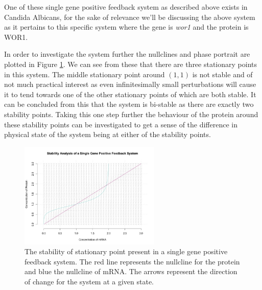 \documentclass[]{article}
\begin{document}
            One of these single gene positive feedback system as described above exists in Candida Albicans, for the sake of relevance we'll be discussing the above system as it pertains to this specific system where the gene is \textit{wor1} and the protein is WOR1. 
            
            In order to investigate the system further the nullclines and phase portrait are plotted in Figure \ref{stabilitySinglePositive}. We can see from these that there are three stationary points in this system. The middle stationary point around $(1,1)$ is not stable and of not much practical interest as even infinitesimally small perturbations will cause it to tend towards one of the other stationary points of which are both stable. It can be concluded from this that the system is bi-stable as there are exactly two stability points. Taking this one step further the behaviour of the protein around these stability points can be investigated to get a sense of the difference in physical state of the system being at either of the stability points. 
            
             \begin{figure}[h!]
            \centering
            \includegraphics[width=0.6\textwidth]{./figures/stabilitySinglePositive.jpeg}
            \caption{The stability of stationary point present in a single gene positive feedback system. The red line represents the nullcline for the protein and blue the nullcline of mRNA. The arrows represent the direction of change for the system at a given state.}
            \label{stabilitySinglePositive}
            \end{figure}
            
\end{document}
